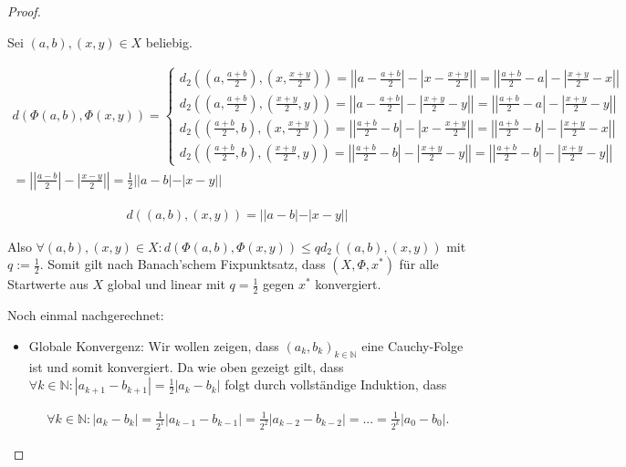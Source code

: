 \documentclass[]{article}
\begin{document}
\begin{proof}
\begin{enumerate}[label=\alph*)]
		Sei $(a,b), (x,y) \in X$ beliebig.
		
		\begin{align*}
			d(\Phi(a,b), \Phi(x,y))=
			\begin{cases}
				d_2((a, \frac{a+b}{2}), (x,\frac{x+y}{2})) =
				\left|\left|a - \frac{a+b}{2}\right| - \left|x - \frac{x+y}{2}\right|\right| =
				\left|\left|\frac{a+b}{2} - a\right| - \left|\frac{x+y}{2} - x\right|\right| \\
				d_2((a, \frac{a+b}{2}), (\frac{x+y}{2},y))  =
				\left|\left|a - \frac{a+b}{2}\right| - \left|\frac{x+y}{2} - y\right|\right| =
				\left|\left|\frac{a+b}{2} - a\right| - \left|\frac{x+y}{2} - y\right|\right| \\
				d_2((\frac{a+b}{2}, b), (x,\frac{x+y}{2}))  =
				\left|\left|\frac{a+b}{2} - b\right| - \left|x - \frac{x+y}{2}\right|\right| =
				\left|\left|\frac{a+b}{2} - b\right| - \left|\frac{x+y}{2} - x\right|\right| \\
				d_2((\frac{a+b}{2}, b), (\frac{x+y}{2},y))  =
				\left|\left|\frac{a+b}{2} - b\right| - \left|\frac{x+y}{2} - y\right|\right| =
				\left|\left|\frac{a+b}{2} - b\right| - \left|\frac{x+y}{2} - y\right|\right|
			\end{cases}\\
			= \left|\left|\frac{a-b}{2}\right|-\left|\frac{x-y}{2}\right|\right|=\frac{1}{2}||a-b|-|x-y||
		\end{align*}
		
		\begin{align*}
			d((a,b),(x,y)) = ||a-b|-|x-y||
		\end{align*}
		
		Also $\forall (a,b), (x,y) \in X: d(\Phi(a,b), \Phi(x,y)) \le q d_2((a,b),(x,y))$ mit $q:=\frac{1}{2}$. Somit gilt nach Banach'schem Fixpunktsatz, dass $(X, \Phi, x^*)$ für alle Startwerte aus $X$ global und linear mit $q=\frac{1}{2}$ gegen $x^*$ konvergiert.
		
		\vspace{3cm}
		
		Noch einmal nachgerechnet:
		
		\begin{itemize}
			\item Globale Konvergenz: Wir wollen zeigen, dass $(a_k, b_k)_{k \in \mathbb{N}}$ eine Cauchy-Folge ist und somit konvergiert.	
			Da wie oben gezeigt gilt, dass $\forall k \in \mathbb{N}: |a_{k+1} - b_{k+1}| = \frac{1}{2}|a_k - b_k|$ folgt durch vollständige Induktion, dass
			
			\begin{align*}
				\forall k \in \mathbb{N}: |a_k - b_k| = \frac{1}{2^{1}}|a_{k-1} - b_{k-1}| = \frac{1}{2^{2}}|a_{k-2} - b_{k-2}| = ... = \frac{1}{2^{k}}|a_0 - b_0|.
			\end{align*}
			

\end{itemize}
\end{enumerate}
\end{proof}
\end{document}
